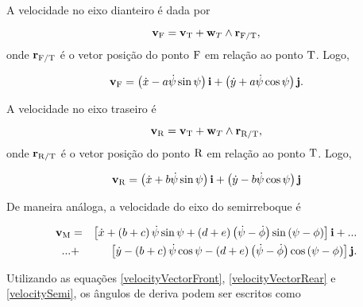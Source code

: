 \documentclass[sublist]{fei}
\begin{document}
A velocidade no eixo dianteiro é dada por

\begin{equation}
    {\bf v}_{\rm F} = {\bf v}_{\rm T} + {\bf w}_T \wedge {\bf r}_{{\rm F}/{\rm T}},
\end{equation}
onde \({\bf r}_{{\rm F}/{\rm T}}\) é o vetor posição do ponto \({\rm F}\) em relação ao ponto \({\rm T}\). Logo,

\begin{equation} \label{velocityVectorFront}
    {\bf v}_{\rm F} = \left( \dot{x} - a \dot{\psi} \sin \psi \right) {\bf i} + \left( \dot{y} + a \dot{\psi} \cos \psi \right) {\bf j}.
\end{equation}

A velocidade no eixo traseiro é

\begin{equation}
    {\bf v}_{\rm R} = {\bf v}_{\rm T} + {\bf w}_T \wedge {\bf r}_{{\rm R}/{\rm T}},
\end{equation}
onde \({\bf r}_{{\rm R}/{\rm T}}\) é o vetor posição do ponto \({\rm R}\) em relação ao ponto \({\rm T}\). Logo,

\begin{equation} \label{velocityVectorRear}
    {\bf v}_{\rm R} = \left( \dot{x} + b \dot{\psi} \sin \psi \right) {\bf i} + \left( \dot{y} -b \dot{\psi} \cos \psi \right) {\bf j}
\end{equation}

De maneira análoga, a velocidade do eixo do semirreboque é

\begin{eqnarray} \label{velocitySemi}
    \nonumber
    {\bf v}_{\rm M} &=& \left[ \dot{x} + \left( b + c \right) \dot{\psi} \sin \psi + \left( d + e \right) \left( \dot{\psi} - \dot{\phi} \right) \sin \left( \psi - \phi \right) \right] {\bf i} + ... \\
    \nonumber
    ... &+& \left[ \dot{y} - \left( b + c \right) \dot{\psi} \cos \psi - \left( d + e \right) \left( \dot{\psi} - \dot{\phi} \right) \cos \left( \psi - \phi \right) \right] {\bf j}. \\
\end{eqnarray}

Utilizando as equações \eqref{velocityVectorFront}, \eqref{velocityVectorRear} e \eqref{velocitySemi}, os ângulos de deriva podem ser escritos como
\end{document}
